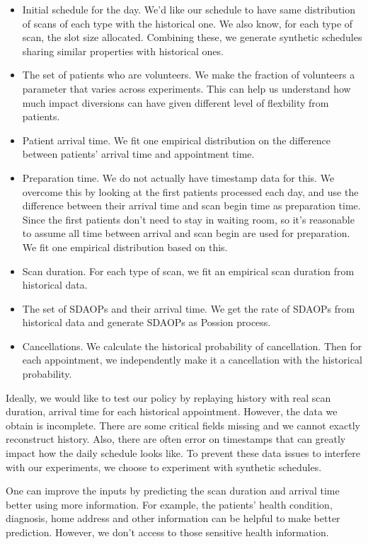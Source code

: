 \begin{itemize}
\item Initial schedule for the day. We'd like our schedule to have
  same distribution of scans of each type with the historical one.
  We also know, for each type of scan, the slot size allocated.
  Combining these, we generate synthetic schedules sharing similar
  properties with historical ones.
\item The set of patients who are volunteers. We make the fraction
  of volunteers a parameter that varies across experiments.
  This can help us understand how much impact diversions can have
  given different level of flexbility from patients.
\item Patient arrival time. We fit one empirical distribution on
  the difference between patients' arrival time and appointment time.
\item Preparation time. We do not actually have timestamp data for this.
  We overcome this by looking at the first patients processed each day,
  and use the difference between their arrival time and scan begin time
  as preparation time. Since the first patients don't need to stay in
  waiting room, so it's reasonable to assume all time between arrival
  and scan begin are used for preparation. We fit one empirical distribution
  based on this.
\item Scan duration. For each type of scan, we fit an empirical
  scan duration from historical data.
\item The set of SDAOPs and their arrival time. We get the rate of
  SDAOPs from historical data and generate SDAOPs as Possion process.
\item Cancellations. We calculate the historical probability of cancellation.
  Then for each appointment, we independently make it a cancellation with
  the historical probability.
\end{itemize}
Ideally, we would like to test our policy by replaying history with real
scan duration, arrival time for each historical appointment. However,
the data we obtain is incomplete. There are some critical fields missing
and we cannot exactly reconstruct history. Also, there are often
error on timestamps that can greatly impact how the daily schedule looks like.
To prevent these data issues to interfere with our experiments, we choose
to experiment with synthetic schedules.

One can improve the inputs by predicting the scan duration and
arrival time better using more information. For example, the patients'
health condition, diagnosis, home address and other information can be
helpful to make better prediction. However, we don't access to those
sensitive health information.

